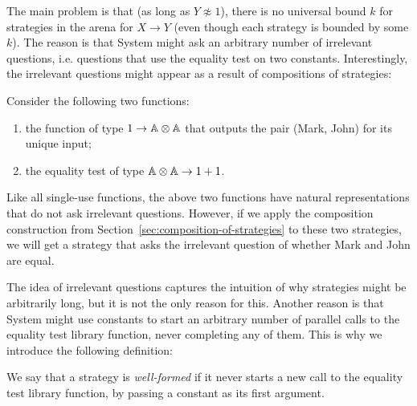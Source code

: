 The main problem is that (as long as $Y \not \approx 1$), there is no universal bound $k$ for strategies in the arena for $X \to Y$
(even though each strategy is bounded by some $k$). The  reason is that System might ask an arbitrary number of irrelevant questions, 
i.e. questions that use the equality test on two constants. Interestingly, the irrelevant questions might appear as a result of compositions of strategies:
\begin{example}\label{ex:irrelevant-questions-from-composition}
    Consider the  following two functions: 
    \begin{enumerate}
        \item the function of type  $1 \to \mathbb A \otimes \mathbb A$ that outputs the pair (Mark, John) for its unique input;
        \item the equality test of type $\mathbb A \otimes \mathbb A \to 1 + 1$.
    \end{enumerate}
    Like all single-use functions, the above two functions have natural representations that do not ask irrelevant questions.
    However, if we apply the composition construction from Section~\ref{sec:composition-of-strategies} to these two strategies, we will get a strategy that asks the irrelevant question of whether Mark and John are equal. \exampleend
\end{example}

The idea of irrelevant questions captures the intuition of why strategies might be arbitrarily long, but it is not the only reason for this. Another reason is that System might use constants to start an arbitrary number of parallel calls to the equality test library function, 
never completing any of them. This is why we introduce the following definition:
\begin{definition}
    We say that a strategy is \emph{well-formed} if it never starts a new call to the equality test library function, by passing a constant as its first argument.
\end{definition}

